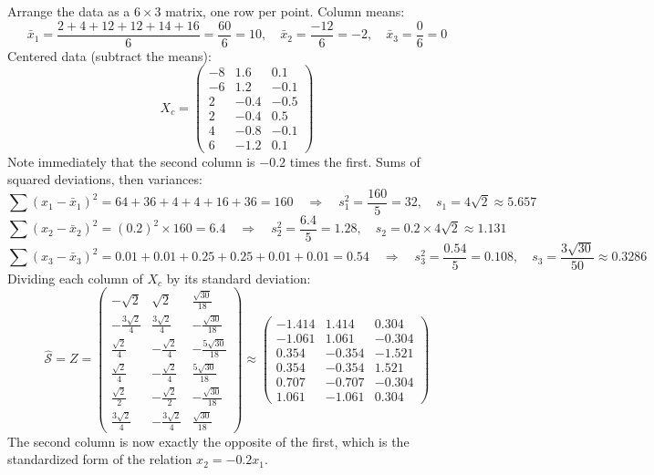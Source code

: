 \documentclass[]{article}
\begin{document}
	Arrange the data as a $6 \times 3$ matrix, one row per point.
	Column means:
	$$
	\bar{x}_1 = \frac{2 + 4 + 12 + 12 + 14 + 16}{6} = \frac{60}{6} = 10,
	\quad
	\bar{x}_2 = \frac{-12}{6} = -2,
	\quad
	\bar{x}_3 = \frac{0}{6} = 0
	$$
	Centered data (subtract the means):
	$$
	X_c =
	\begin{pmatrix}
		-8 & 1.6 & 0.1 \\
		-6 & 1.2 & -0.1 \\
		2 & -0.4 & -0.5 \\
		2 & -0.4 & 0.5 \\
		4 & -0.8 & -0.1 \\
		6 & -1.2 & 0.1
	\end{pmatrix}
	$$
	Note immediately that the second column is $-0.2$ times the first.
	Sums of squared deviations, then variances:
	$$
	\textstyle\sum (x_1 - \bar{x}_1)^2 = 64 + 36 + 4 + 4 + 16 + 36 = 160
	\quad\Rightarrow\quad
	s_1^2 = \frac{160}{5} = 32,
	\quad s_1 = 4\sqrt{2} \approx 5.657
	$$
	$$
	\textstyle\sum (x_2 - \bar{x}_2)^2 = (0.2)^2 \times 160 = 6.4
	\quad\Rightarrow\quad
	s_2^2 = \frac{6.4}{5} = 1.28,
	\quad s_2 = 0.2 \times 4\sqrt{2} \approx 1.131
	$$
	$$
	\textstyle\sum (x_3 - \bar{x}_3)^2 = 0.01 + 0.01 + 0.25 + 0.25 + 0.01 + 0.01 = 0.54
	\quad\Rightarrow\quad
	s_3^2 = \frac{0.54}{5} = 0.108,
	\quad s_3 = \frac{3\sqrt{30}}{50} \approx 0.3286
	$$
	Dividing each column of $X_c$ by its standard deviation:
	$$
	\hat{\mathcal{S}} = Z =
	\begin{pmatrix}
		-\sqrt{2} & \sqrt{2} & \frac{\sqrt{30}}{18} \\[2pt]
		-\frac{3\sqrt{2}}{4} & \frac{3\sqrt{2}}{4} & -\frac{\sqrt{30}}{18} \\[2pt]
		\frac{\sqrt{2}}{4} & -\frac{\sqrt{2}}{4} & -\frac{5\sqrt{30}}{18} \\[2pt]
		\frac{\sqrt{2}}{4} & -\frac{\sqrt{2}}{4} & \frac{5\sqrt{30}}{18} \\[2pt]
		\frac{\sqrt{2}}{2} & -\frac{\sqrt{2}}{2} & -\frac{\sqrt{30}}{18} \\[2pt]
		\frac{3\sqrt{2}}{4} & -\frac{3\sqrt{2}}{4} & \frac{\sqrt{30}}{18}
	\end{pmatrix}
	\approx
	\begin{pmatrix}
		-1.414 & 1.414 & 0.304 \\
		-1.061 & 1.061 & -0.304 \\
		0.354 & -0.354 & -1.521 \\
		0.354 & -0.354 & 1.521 \\
		0.707 & -0.707 & -0.304 \\
		1.061 & -1.061 & 0.304
	\end{pmatrix}
	$$
	The second column is now exactly the opposite of the first, which is the standardized form of the relation $x_2 = -0.2 x_1$.
\end{document}
